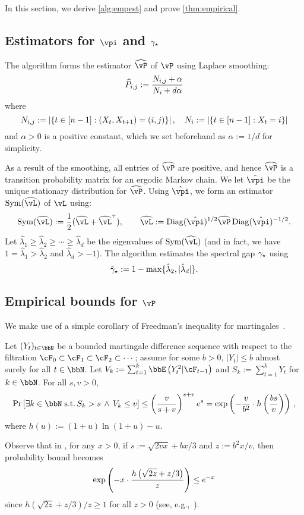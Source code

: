 In this section, we derive \cref{alg:empest} and prove
\cref{thm:empirical}.

\subsection{Estimators for $\vpi$ and $\gamma_{\star}$}

The algorithm forms the estimator $\wh\vP$ of $\vP$ using Laplace smoothing:
\[
  \widehat{P}_{i,j}
  := \frac{N_{i,j} + \alpha}{N_i + d\alpha}
\]
where
\[
  N_{i,j} := \left| \left\{ t \in [n-1] : (X_t,X_{t+1}) = (i,j) \right\} \right| ,
  \quad
  N_i := \left| \left\{ t \in [n-1] : X_t = i \right\} \right|
\]
and $\alpha>0$ is a positive constant, which we set beforehand as $\alpha := 1/d$
for simplicity.

As a result of the smoothing, all entries of $\wh\vP$ are positive,
and hence $\wh\vP$ is a transition probability
matrix for an ergodic Markov chain.
We let $\hat\vpi$ be the unique stationary distribution for $\wh\vP$.
Using $\hat\vpi$, we form an estimator $\Sym(\wh\vL)$ of $\vL$ using:
\[
  \Sym(\wh\vL) := \frac12 \parens{ \wh\vL + \wh\vL^\t }
  ,
  \qquad
  \wh\vL := \Diag(\hat\vpi)^{1/2} \wh\vP \Diag(\hat\vpi)^{-1/2}
  .
\]
Let $\hat\lambda_1 \geq \hat\lambda_2 \geq \dotsb \geq \hat\lambda_d$
be the eigenvalues of $\Sym(\wh\vL)$ (and in fact, we have $1 =
\hat\lambda_1 > \hat\lambda_2$ and $\hat\lambda_d > -1$).
The algorithm estimates the spectral gap $\gamma_{\star}$ using
\[
  \hat\gamma_{\star} := 1 - \max\{ \hat\lambda_2, |\hat\lambda_d| \} .
\]

\subsection{Empirical bounds for $\vP$}
\label{sec:P-obs-bound}

We make use of a simple corollary of Freedman's inequality for
martingales~\citep[Theorem 1.6]{Fre75}.
\begin{theorem}
  \label{thm:freedman}
  Let $(Y_t)_{t \in \bbN}$ be a bounded martingale difference sequence
  with respect to the filtration $\cF_0 \subset \cF_1 \subset \cF_2
  \subset \dotsb$; assume for some $b>0$, $|Y_t| \leq b$ almost surely
  for all $t \in \bbN$.
  Let $V_k := \sum_{t=1}^k \EE{Y_t^2|\cF_{t-1}}$ and $S_k :=
  \sum_{t=1}^k Y_t$ for $k \in \bbN$.
  For all $s, v > 0$,
  \[
    \Pr\Brackets{
      \exists k \in \bbN \;\st\,
      S_k > s
      \,\wedge\,
      V_k \leq v
    }
    \leq \Parens{
      \frac{v}{s+v}
    }^{s+v}
    e^s
    = \exp\Parens{
      -\frac{v}{b^2} \cdot h\Parens{\frac{bs}{v}}
    }
    \,,
  \]
  where $h(u) := (1+u)\ln(1+u) - u$.
\end{theorem}
Observe that in , for any $x>0$, if $s :=
\sqrt{2vx} + bx/3$ and $z := b^2x/v$, then probability bound becomes
\[
  \exp\left(
    -x \cdot \frac{h\left(\sqrt{2z}+z/3\right)}{z}
  \right)
  \leq
  e^{-x}
\]
since $h(\sqrt{2z}+z/3)/z \geq 1$ for all $z > 0$ (see,
e.g.,~\citep[proof of Lemma 5]{audibert2009}).


